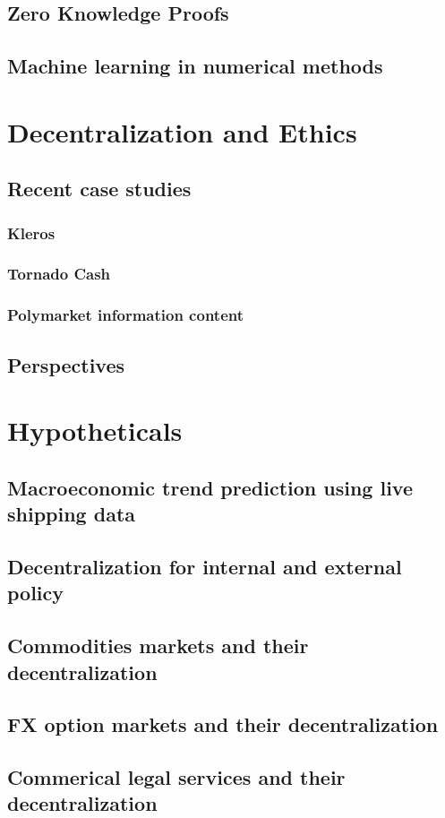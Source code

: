 \documentclass[11pt]{article}
\begin{document}
\subsection{Zero Knowledge Proofs}
\subsection{Machine learning in numerical methods}


\section{Decentralization and Ethics}
\subsection{Recent case studies}
\subsubsection{Kleros~\cite{zhuk_2023_applying}}
\subsubsection{Tornado Cash~\cite{nadler_2023_tornado}~\cite{pertsev_2019_tornado}}
\subsubsection{Polymarket information content}
\subsection{Perspectives}


\section{Hypotheticals}
\subsection{Macroeconomic trend prediction using live shipping data}
\subsection{Decentralization for internal and external policy}
\subsection{Commodities markets and their decentralization}
\subsection{FX option markets and their decentralization}
\subsection{Commerical legal services and their decentralization}

\newpage
\printbibliography
{}
\end{document}
